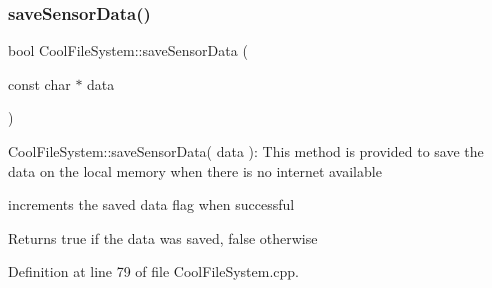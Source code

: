 \subsubsection{\texorpdfstring{save\+Sensor\+Data()}{saveSensorData()}}
{\footnotesize\ttfamily bool Cool\+File\+System\+::save\+Sensor\+Data (\begin{DoxyParamCaption}\item[{const char $\ast$}]{data }\end{DoxyParamCaption})}

Cool\+File\+System\+::save\+Sensor\+Data( data )\+: This method is provided to save the data on the local memory when there is no internet available

increments the saved data flag when successful

\begin{DoxyReturn}{Returns}
true if the data was saved, false otherwise 
\end{DoxyReturn}


Definition at line 79 of file Cool\+File\+System.\+cpp.


